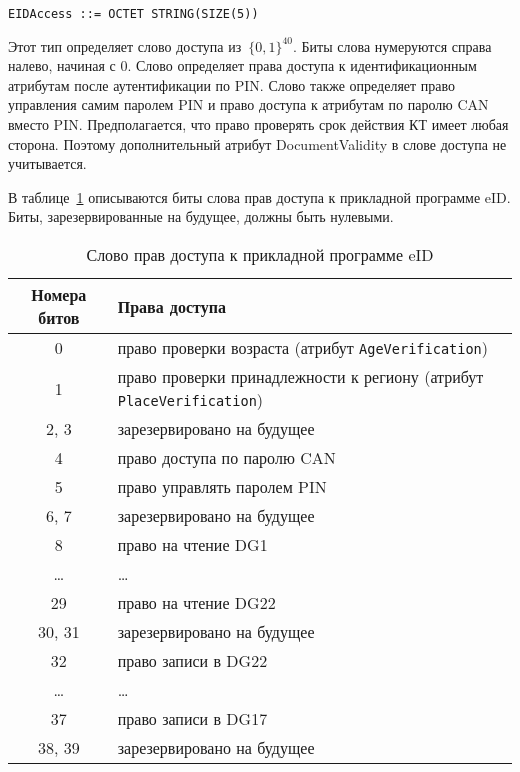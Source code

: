 \begin{verbatim}
EIDAccess ::= OCTET STRING(SIZE(5))
\end{verbatim}

Этот тип определяет слово доступа из~$\{0,1\}^{40}$. 
Биты слова нумеруются справа налево, начиная с 0. 
Слово определяет права доступа к идентификационным атрибутам после 
аутентификации по PIN.  
%
Слово также определяет право управления самим паролем 
PIN и право доступа к атрибутам по паролю CAN вместо PIN. 
%
Предполагается, что право проверять срок действия КТ 
имеет любая сторона. Поэтому дополнительный атрибут DocumentValidity в слове 
доступа не учитывается. 

В таблице~\ref{Table.DATA.Access} описываются биты слова прав 
доступа к прикладной программе eID. Биты, зарезервированные на будущее, 
должны быть нулевыми.

\begin{table}[h!]
\caption{Слово прав доступа к прикладной программе eID}
\label{Table.DATA.Access}
\begin{tabular}{|c|p{13.5cm}|}
\hline
Номера битов & Права доступа\\
\hline
\hline
0 & право проверки возраста (атрибут \verb|AgeVerification|)\\
\hline 
1  &  право проверки принадлежности к региону (атрибут \verb|PlaceVerification|)\\
\hline 
2, 3 & зарезервировано на будущее\\
\hline 
4 & право доступа по паролю CAN\\
\hline
5 & право управлять паролем PIN\\
\hline 
6, 7 & зарезервировано на будущее\\
\hline 
8  &  право на чтение DG1\\
\hline 
\dots &	\dots\\
\hline 
29 &  право на чтение DG22\\
\hline
30, 31 & зарезервировано на будущее\\
\hline 
32 & право записи в DG22\\
\hline
\dots &	\dots  \\
\hline
37 & право записи в DG17\\
\hline 
38, 39 & зарезервировано на будущее\\
\hline                                                                
\end{tabular}
\end{table}
                                                                            
